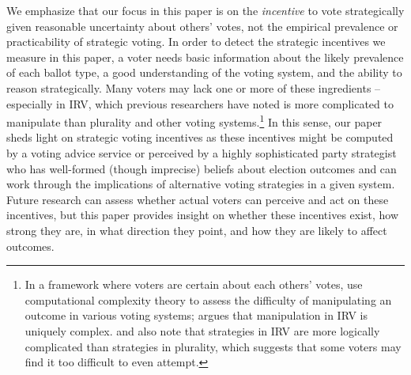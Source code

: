 \documentclass[11pt,a4paper]{article}
\begin{document}
We emphasize that our focus in this paper %
 is on the \emph{incentive} to vote strategically given reasonable uncertainty about others' votes, not the empirical prevalence or practicability of strategic voting. In order to detect the strategic incentives we measure in this paper, a voter needs basic information about the likely prevalence of each ballot type, a good understanding of the voting system, and the ability to reason strategically. Many voters may lack one or more of these ingredients \--- especially in IRV, which previous researchers have noted is more complicated to manipulate than plurality and other voting systems.\footnote{In a framework where voters are certain about each others' votes, \citet{bartholdi1989computational} use computational complexity theory to assess the difficulty of manipulating an outcome in various voting systems; \citet{bartholdi1991single} argues that manipulation in IRV is uniquely complex. \citet{cox1997making} and \citet{renwick2011alternative} also note that strategies in IRV are more logically complicated than strategies in plurality, which suggests that some voters may find it too difficult to even attempt.} In this sense, our paper sheds light on strategic voting incentives as these incentives might be computed by a voting advice service or perceived by a highly sophisticated party strategist who has well-formed (though imprecise) beliefs about election outcomes and can work through the implications of alternative voting strategies in a given system. %
Future research can assess whether actual voters can perceive and act on these incentives, but this paper provides insight on whether these incentives exist, how strong they are, in what direction they point, and how they are likely to affect outcomes.
 
  
\end{document}
